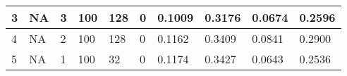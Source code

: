 \begin{table}
{\begin{tabular}{|llllllllll|}
3             & NA                                                              & 3                                                               & 100            & 128                                                            & 0                & 0.1009                                                                    & 0.3176                                                                   & 0.0674                                                               & 0.2596                                                              \\ \hline
4             & NA                                                              & 2                                                               & 100            & 128                                                            & 0                & 0.1162                                                                    & 0.3409                                                                   & 0.0841                                                               & 0.2900                                                              \\ \hline
5             & NA                                                              & 1                                                               & 100            & 32                                                             & 0                & 0.1174                                                                    & 0.3427                                                                   & 0.0643                                                               & 0.2536                                                              \\ \hline
\end{tabular}}
\end{table}
